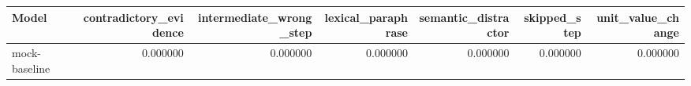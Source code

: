 \begin{tabular}{lrrrrrr}
\toprule
Model & contradictory_evidence & intermediate_wrong_step & lexical_paraphrase & semantic_distractor & skipped_step & unit_value_change \\
\midrule
mock-baseline & 0.000000 & 0.000000 & 0.000000 & 0.000000 & 0.000000 & 0.000000 \\
\bottomrule
\end{tabular}
